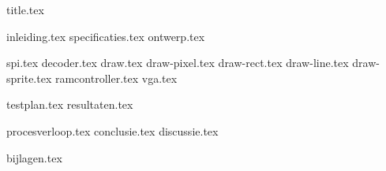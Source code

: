 \documentclass[final]{scrreprt}
\begin{document}

{title.tex}

\newpage

\tableofcontents

\newpage
{}
{inleiding.tex}
{specificaties.tex}
{ontwerp.tex}

{spi.tex}
{decoder.tex}
{draw.tex}
{draw-pixel.tex}
{draw-rect.tex}
{draw-line.tex}
{draw-sprite.tex}
{ramcontroller.tex}
{vga.tex}

{testplan.tex}
{resultaten.tex}

{procesverloop.tex}
{conclusie.tex}
{discussie.tex}

\newpage
{}

\printbibliography
{bijlagen.tex}
\end{document}

